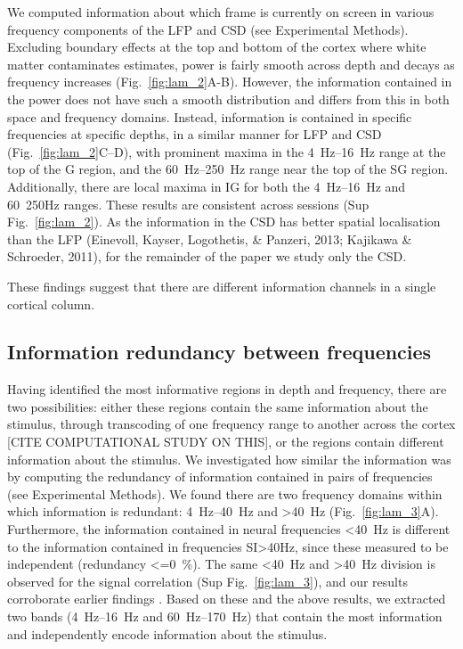 We computed information about which frame is currently on screen in various frequency components of the \ac{LFP} and \ac{CSD} (see Experimental Methods).
Excluding boundary effects at the top and bottom of the cortex where white matter contaminates estimates, power is fairly smooth across depth and decays as frequency increases (Fig.~\ref{fig:lam_2}A-B).
However, the information contained in the power does not have such a smooth distribution and differs from this in both space and frequency domains.
Instead, information is contained in specific frequencies at specific depths, in a similar manner for \ac{LFP} and \ac{CSD} (Fig.~\ref{fig:lam_2}C--D), with prominent maxima in the \SIrange{4}{16}{Hz} range at the top of the \ac{G} region, and the \SIrange{60}{250}{Hz} range near the top of the \ac{SG} region.
Additionally, there are local maxima in \ac{IG} for both the \SIrange{4}{16}{Hz} and \SI{60}{250}{Hz} ranges.
These results are consistent across sessions (Sup Fig.~\ref{fig:lam_2}).
As the information in the \ac{CSD} has better spatial localisation than the \ac{LFP} (Einevoll, Kayser, Logothetis, \& Panzeri, 2013; Kajikawa \& Schroeder, 2011), for the remainder of the paper we study only the \ac{CSD}.

These findings suggest that there are different information channels in a single cortical column.

\subsection{Information redundancy between frequencies}
Having identified the most informative regions in depth and frequency, there are two possibilities: either these regions contain the same information about the stimulus, through transcoding of one frequency range to another across the cortex [CITE COMPUTATIONAL STUDY ON THIS], or the regions contain different information about the stimulus.
We investigated how similar the information was by computing the redundancy of information contained in pairs of frequencies (see Experimental Methods).
We found there are two frequency domains within which information is redundant: \SIrange{4}{40}{Hz} and \SI{>40}{Hz} (Fig.~\ref{fig:lam_3}A).
Furthermore, the information contained in neural frequencies \SI{<40}{Hz} is different to the information contained in frequencies SI{>40}{Hz}, since these measured to be independent (redundancy \SI{<=0}{\percent}).
The same \SI{<40}{Hz} and \SI{>40}{Hz} division is observed for the signal correlation (Sup Fig.~\ref{fig:lam_3}), and our results corroborate earlier findings \citep{Belitski2008}.
Based on these and the above results, we extracted two bands (\SIrange{4}{16}{Hz} and \SIrange{60}{170}{Hz}) that contain the most information and independently encode information about the stimulus.

